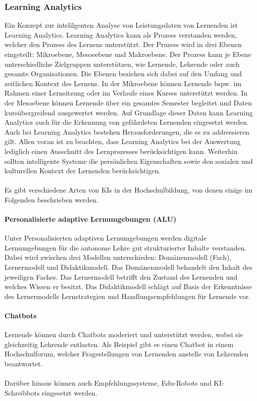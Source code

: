 \subsubsection*{Learning Analytics}
Ein Konzept zur intelilgenten Analyse von Leistungsdaten von Lernenden ist Learning Analytics.
Learning Analytics kann als Prozess verstanden werden, welcher den Prozess des Lernens unterstützt.
Der Prozess wird in drei Ebenen eingeteilt: Mikroebene, Mesoeebene und Makroebene.
Der Prozess kann je Ebene unterschiedliche Zielgruppen unterstützen, wie Lernende, Lehrende oder auch gesamte Organisationen.
Die Ebenen beziehen sich dabei auf den Umfang und zeitlichen Kontext des Lernens.
In der Mikroebene können Lernende bspw. im Rahmen einer Lernsitzung oder im Verlaufe eines Kurses unterstützt werden.
In der Mesoebene können Lernende über ein gesamtes Semester begleitet und Daten kursübergreifend ausgewertet werden.
Auf Grundlage dieser Daten kann Learning Analytics auch für die Erkennung von gefährdeten Lernenden eingesetzt werden.\cite*[S. 14ff]{Witt.2020}
\\ \noindent
Auch bei Learning Analytics bestehen Herausforderungen, die es zu addressieren gilt.
Allen voran ist zu beachten, dass Learning Analytics bei der Auswertung lediglich einen Ausschnitt des Lernprozesses berücksichtigen kann.
Weiterhin sollten intelligente Systeme die persönlichen Eigenschaften sowie den sozialen und kulturellen Kontext der Lernenden berücksichtigen. \cite*[S. 16]{Witt.2020}
\\ \\ \noindent
Es gibt verschiedene Arten von KIs in der Hochschulbildung, von denen einige im Folgenden beschrieben werden.

\paragraph*{Personalisierte adaptive Lernumgebungen (ALU)}
Unter Personalisierten adaptiven Lernumgebungen werden digitale Lernumgebungen für die autonome Lehre gut strukturierter Inhalte verstanden.
Dabei wird zwischen drei Modellen unterschieden: Domänenmodell (Fach), Lernermodell und Didaktikmodell.
Das Domänenmodell behandelt den Inhalt des jeweiligen Faches.
Das Lernermodell betrifft den Zustand des Lernenden und welches Wissen er besitzt.
Das Didaktikmodell schlägt auf Basis der Erkenntnisse des Lernermodells Lernstrategien und Handlungsempfehlungen für Lernende vor. \cite*[S. 17f]{Witt.2020}
\paragraph*{Chatbots}
Lernende können durch Chatbots moderiert und unterstützt werden, wobei sie gleichzeitig Lehrende entlasten. Als Beispiel gibt es einen Chatbot in einem Hochschulforum, welcher Fragestellungen von Lernenden anstelle von Lehrenden beantwortet. \cite*[S. 18ff]{Witt.2020}
\\ \\ \noindent
Darüber hinaus können auch Empfehlungssysteme, Edu-Robots und KI-Schreibbots eingesetzt werden. \cite*[S. 18-21]{Witt.2020}
